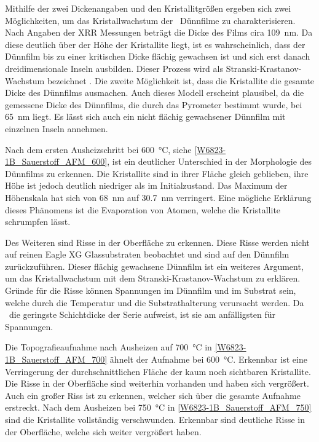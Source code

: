 Mithilfe der zwei Dickenangaben und den Kristallitgrößen ergeben sich zwei Möglichkeiten, um das Kristallwachstum
der \heo\ Dünnfilme zu charakterisieren.
Nach Angaben der XRR Messungen beträgt die Dicke des Films cira \qty{109}{\nano\meter}.
Da diese deutlich über der Höhe der Kristallite liegt, ist es wahrscheinlich, dass der Dünnfilm bis zu einer
kritischen Dicke flächig gewachsen ist und sich erst danach dreidimensionale Inseln ausbilden.
Dieser Prozess wird als Stranski-Krastanov-Wachstum bezeichnet \autocite{Lorenz2019}.
Die zweite Möglichkeit ist, dass die Kristallite die gesamte Dicke des Dünnfilms ausmachen.
Auch dieses Modell erscheint plausibel, da die gemessene Dicke des Dünnfilms, die durch das Pyrometer bestimmt wurde,
bei \qty{65}{\nano\meter} liegt.
Es lässt sich auch ein nicht flächig gewachsener Dünnfilm mit einzelnen Inseln annehmen.

Nach dem ersten Ausheizschritt bei \qty{600}{\degreeCelsius}, siehe \cref{W6823-1B_Sauerstoff_AFM_600}, ist ein
deutlicher Unterschied in der Morphologie des Dünnfilms zu erkennen.
Die Kristallite sind in ihrer Fläche gleich geblieben, ihre Höhe ist jedoch deutlich niedriger als im Initialzustand.
Das Maximum der Höhenskala hat sich von \qty{68}{\nano\meter} auf \qty{30.7}{\nano\meter} verringert.
Eine mögliche Erklärung dieses Phänomens ist die Evaporation von Atomen, welche die Kristallite schrumpfen lässt.

Des Weiteren sind Risse in der Oberfläche zu erkennen.
Diese Risse werden nicht auf reinen Eagle XG Glassubstraten beobachtet und sind auf den Dünnfilm zurückzuführen.
Dieser flächig gewachsene Dünnfilm ist ein weiteres Argument, um das Kristallwachstum mit dem
Stranski-Krastanov-Wachstum zu erklären.
Gründe für die Risse können Spannungen im Dünnfilm und im Substrat sein, welche durch die Temperatur und die
Substrathalterung verursacht werden.
Da \samplethree\ die geringste Schichtdicke der Serie aufweist, ist sie am anfälligsten für Spannungen.

Die Topografieaufnahme nach Ausheizen auf \qty{700}{\degreeCelsius} in \cref{W6823-1B_Sauerstoff_AFM_700} ähnelt
der Aufnahme bei \qty{600}{\degreeCelsius}.
Erkennbar ist eine Verringerung der durchschnittlichen Fläche der kaum noch sichtbaren Kristallite.
Die Risse in der Oberfläche sind weiterhin vorhanden und haben sich vergrößert.
Auch ein großer Riss ist zu erkennen, welcher sich über die gesamte Aufnahme erstreckt.
Nach dem Ausheizen bei \qty{750}{\degreeCelsius} in \cref{W6823-1B_Sauerstoff_AFM_750} sind die Kristallite
vollständig verschwunden.
Erkennbar sind deutliche Risse in der Oberfläche, welche sich weiter vergrößert haben.

